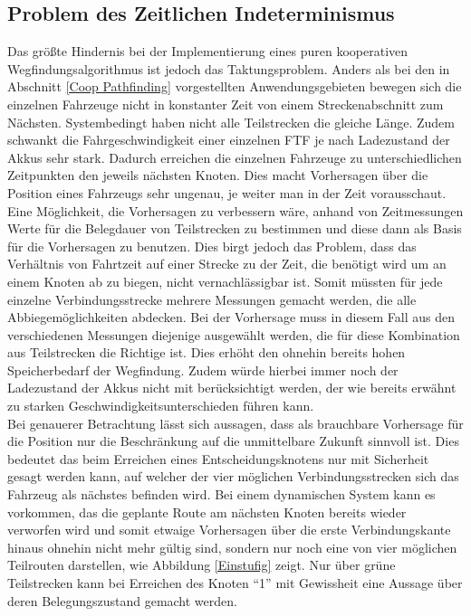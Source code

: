 	\subsection{Problem des Zeitlichen Indeterminismus}
		\label{Zeitproblem}
		Das größte Hindernis bei der Implementierung eines puren kooperativen Wegfindungsalgorithmus ist jedoch das Taktungsproblem. Anders als bei den in Abschnitt \ref{Coop Pathfinding} vorgestellten Anwendungsgebieten bewegen sich die einzelnen Fahrzeuge nicht in konstanter Zeit von einem Streckenabschnitt zum Nächsten. Systembedingt haben nicht alle Teilstrecken die gleiche Länge. Zudem schwankt die Fahrgeschwindigkeit einer einzelnen \ac{FTF} je nach Ladezustand der Akkus sehr stark. Dadurch erreichen die einzelnen Fahrzeuge zu unterschiedlichen Zeitpunkten den jeweils nächsten Knoten. Dies macht Vorhersagen über die Position eines Fahrzeugs sehr ungenau, je weiter man in der Zeit vorausschaut.
		\\[4pt]
		Eine Möglichkeit, die Vorhersagen zu verbessern wäre, anhand von Zeitmessungen Werte für die Belegdauer von Teilstrecken zu bestimmen und diese dann als Basis für die Vorhersagen zu benutzen. Dies birgt jedoch das Problem, dass das Verhältnis von Fahrtzeit auf einer Strecke zu der Zeit, die benötigt wird um an einem Knoten ab zu biegen, nicht vernachlässigbar ist. Somit müssten für jede einzelne Verbindungsstrecke mehrere Messungen gemacht werden, die alle Abbiegemöglichkeiten abdecken. Bei der Vorhersage muss in diesem Fall aus den verschiedenen Messungen diejenige ausgewählt werden, die für diese Kombination aus Teilstrecken die Richtige ist. Dies erhöht den ohnehin bereits hohen Speicherbedarf der Wegfindung. Zudem würde hierbei immer noch der Ladezustand der Akkus nicht mit berücksichtigt werden, der wie bereits erwähnt zu starken Geschwindigkeitsunterschieden führen kann.
		\\[4pt]
		Bei genauerer Betrachtung lässt sich aussagen, dass als brauchbare Vorhersage für die Position nur die Beschränkung auf die unmittelbare Zukunft sinnvoll ist. Dies bedeutet das beim Erreichen eines Entscheidungsknotens nur mit Sicherheit gesagt werden kann, auf welcher der vier möglichen Verbindungsstrecken sich das Fahrzeug als nächstes befinden wird. Bei einem dynamischen System kann es vorkommen, das die geplante Route am nächsten Knoten bereits wieder verworfen wird und somit etwaige Vorhersagen über die erste Verbindungskante hinaus ohnehin nicht mehr gültig sind, sondern nur noch eine von vier möglichen Teilrouten darstellen, wie Abbildung \ref{Einstufig} zeigt. Nur über grüne Teilstrecken kann bei Erreichen des Knoten "`1"' mit Gewissheit eine Aussage über deren Belegungszustand gemacht werden.
		
